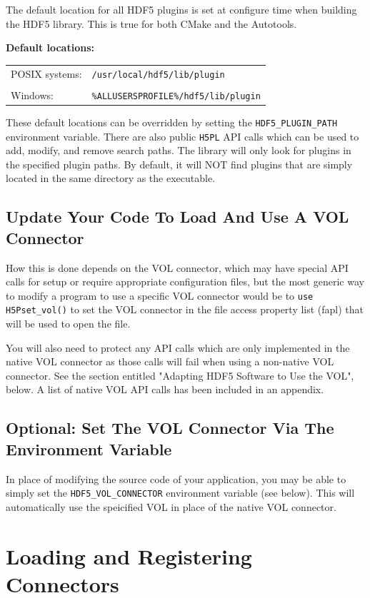 The default location for all HDF5 plugins is set at configure time when building the HDF5 library. This is true for both CMake and the Autotools.

\textbf{Default locations:}

\begin{tabular}{ l l }
    POSIX systems: &  {\tt /usr/local/hdf5/lib/plugin} \\
     & \\
    Windows: & {\tt \%ALLUSERSPROFILE\%/hdf5/lib/plugin}
\end{tabular}

These default locations can be overridden by setting the {\tt HDF5\_PLUGIN\_PATH} environment variable. There are also public {\tt H5PL} API calls which can be used to add, modify, and remove search paths. The library will only look for plugins in the specified plugin paths. By default, it will NOT find plugins that are simply located in the same directory as the executable.

\subsection{Update Your Code To Load And Use A VOL Connector}

How this is done depends on the VOL connector, which may have special API calls for setup or require appropriate configuration files, but the most generic way to modify a program to use a specific VOL connector would be to {\tt use H5Pset\_vol()} to set the VOL connector in the file access property list (fapl) that will be used to open the file.

You will also need to protect any API calls which are only implemented in the native VOL connector as those calls will fail when using a non-native VOL connector. See the section entitled "Adapting HDF5 Software to Use the VOL", below. A list of native VOL API calls has been included in an appendix.

\subsection{Optional: Set The VOL Connector Via The Environment Variable}

In place of modifying the source code of your application, you may be able to simply set the {\tt HDF5\_VOL\_CONNECTOR} environment variable (see below). This will automatically use the speicified VOL in place of the native VOL connector.

\section{Loading and Registering Connectors}

